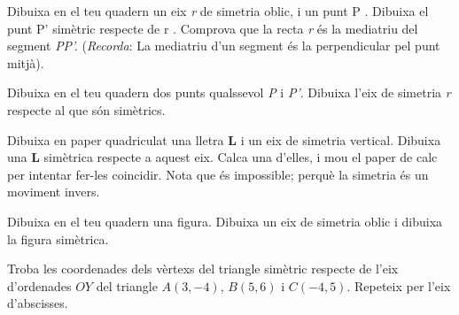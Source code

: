 \begin{mylist}

\exer  Dibuixa en el teu quadern un eix \textit{r} de simetria oblic, i un punt P . Dibuixa el punt P' simètric respecte de r . Comprova que la recta \textit{r} és la mediatriu del segment \textit{PP'.} (\textit{Recorda}: La mediatriu d'un segment és la perpendicular pel punt mitjà).


\exer  Dibuixa en el teu quadern dos punts qualssevol \textit{P} i \textit{P'}. Dibuixa l'eix de simetria \textit{r} respecte al que són simètrics. 


\exer  Dibuixa en paper quadriculat una lletra \textbf{L} i un eix de simetria vertical. Dibuixa una \textbf{L} simètrica respecte a aquest eix. Calca una d'elles, i mou el paper de calc per intentar fer-les coincidir. Nota que és impossible; perquè la simetria és un moviment invers. 


\exer  Dibuixa en el teu quadern una figura. Dibuixa un eix de simetria oblic i dibuixa la figura simètrica.
 

\exer[1]  Troba les coordenades dels vèrtexs del triangle simètric respecte de l'eix d'ordenades $OY$ del triangle $A(3, -4)$, $B(5, 6)$ i $C(-4, 5)$. Repeteix per l'eix d'abscisses.


\end{mylist}
